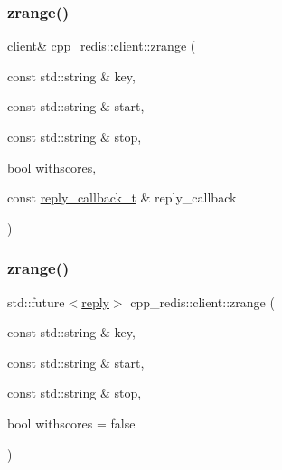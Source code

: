 \subsubsection{\texorpdfstring{zrange()}{zrange()}\hspace{0.1cm}{\footnotesize\ttfamily [8/9]}}
{\footnotesize\ttfamily \hyperlink{classcpp__redis_1_1client}{client}\& cpp\+\_\+redis\+::client\+::zrange (\begin{DoxyParamCaption}\item[{const std\+::string \&}]{key,  }\item[{const std\+::string \&}]{start,  }\item[{const std\+::string \&}]{stop,  }\item[{bool}]{withscores,  }\item[{const \hyperlink{classcpp__redis_1_1client_a061a1140d36d2eaeda82b09a0bb3f9f2}{reply\+\_\+callback\+\_\+t} \&}]{reply\+\_\+callback }\end{DoxyParamCaption})}

\mbox{\label{classcpp__redis_1_1client_aaaaf7f2d11f02bc7709be1b2a654894d}} 
\subsubsection{\texorpdfstring{zrange()}{zrange()}\hspace{0.1cm}{\footnotesize\ttfamily [9/9]}}
{\footnotesize\ttfamily std\+::future$<$\hyperlink{classcpp__redis_1_1reply}{reply}$>$ cpp\+\_\+redis\+::client\+::zrange (\begin{DoxyParamCaption}\item[{const std\+::string \&}]{key,  }\item[{const std\+::string \&}]{start,  }\item[{const std\+::string \&}]{stop,  }\item[{bool}]{withscores = {\ttfamily false} }\end{DoxyParamCaption})}

\mbox{\label{classcpp__redis_1_1client_a5563d5240de4bbdbf6ed5dd8cc92a67a}} 
